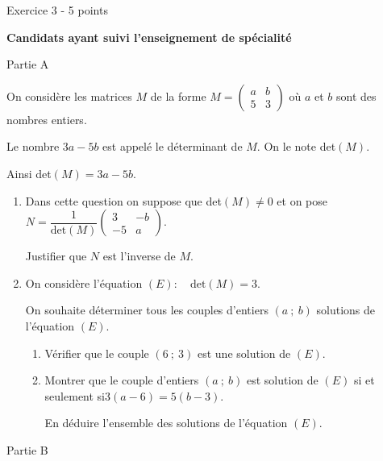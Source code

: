 
%
\begin{h2}Exercice 3 - 5 points\end{h2}
\textbf{Candidats ayant suivi l'enseignement de spécialité}
\begin{h3}Partie A\end{h3}
On considère les matrices $M$ de la forme $M = \begin{pmatrix}a&b \\ 5&3\end{pmatrix}$ où $a$ et $b$ sont des nombres entiers.
\par
Le nombre $3a-5b$ est appelé le déterminant de $M$. On le note det$(M)$.
\par
Ainsi det$(M) = 3a-5b$.
\begin{enumerate}
     \item
     Dans cette question on suppose que det$(M) \ne 0$ et on pose $N = \dfrac{1}{\text{det}(M)}\begin{pmatrix}3&-b \\ -5&a\end{pmatrix}$.
     \par
     Justifier que $N$ est l'inverse de $M$.
     \item
     On considère l'équation $(E) :\quad \text{det}(M) = 3$.
     \par
     On souhaite déterminer tous les couples d'entiers $(a~;~b)$ solutions de l'équation $(E)$.
     \begin{enumerate}
          \item
          Vérifier que le couple $(6~;~3)$ est une solution de $(E)$.
          \item
          Montrer que le couple d'entiers $(a~;~b)$ est solution de $(E)$ si et seulement si$3(a-6) = 5(b-3)$.
          \par
          En déduire l'ensemble des solutions de l'équation $(E)$.
     \end{enumerate}
\end{enumerate}
\begin{h3}Partie B\end{h3}
